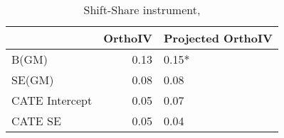 \begin{table}\centering\caption{Shift-Share instrument, }\begin{tabular}{lrl}
\toprule
                &   OrthoIV & Projected OrthoIV   \\
\midrule
 B(GM)          &      0.13 & 0.15*               \\
 SE(GM)         &      0.08 & 0.08                \\
 CATE Intercept &      0.05 & 0.07                \\
 CATE SE        &      0.05 & 0.04                \\
\bottomrule
\end{tabular}\end{table}
